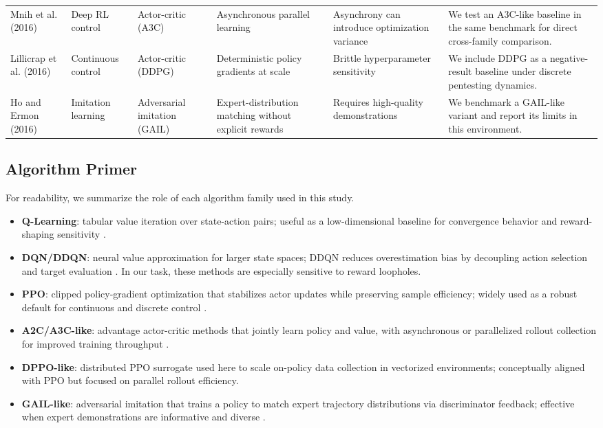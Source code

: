 \documentclass[conference]{IEEEtran}
\begin{document}
\begin{table}[t]
\begin{tabular}{llllll}
Mnih et al. (2016) \cite{mnih2016a3c} & Deep RL control & Actor-critic (A3C) & Asynchronous parallel learning & Asynchrony can introduce optimization variance & We test an A3C-like baseline in the same benchmark for direct cross-family comparison. \\
Lillicrap et al. (2016) \cite{lillicrap2016} & Continuous control & Actor-critic (DDPG) & Deterministic policy gradients at scale & Brittle hyperparameter sensitivity & We include DDPG as a negative-result baseline under discrete pentesting dynamics. \\
Ho and Ermon (2016) \cite{ho2016gail} & Imitation learning & Adversarial imitation (GAIL) & Expert-distribution matching without explicit rewards & Requires high-quality demonstrations & We benchmark a GAIL-like variant and report its limits in this environment. \\
\bottomrule
\end{tabular}
\end{table}

\subsection{Algorithm Primer}
For readability, we summarize the role of each algorithm family used in this study.
\begin{itemize}
    \item \textbf{Q-Learning}: tabular value iteration over state-action pairs; useful as a low-dimensional baseline for convergence behavior and reward-shaping sensitivity \cite{sutton2018}.
    \item \textbf{DQN/DDQN}: neural value approximation for larger state spaces; DDQN reduces overestimation bias by decoupling action selection and target evaluation \cite{mnih2015}. In our task, these methods are especially sensitive to reward loopholes.
    \item \textbf{PPO}: clipped policy-gradient optimization that stabilizes actor updates while preserving sample efficiency; widely used as a robust default for continuous and discrete control \cite{schulman2017ppo}.
    \item \textbf{A2C/A3C-like}: advantage actor-critic methods that jointly learn policy and value, with asynchronous or parallelized rollout collection for improved training throughput \cite{mnih2016a3c}.
    \item \textbf{DPPO-like}: distributed PPO surrogate used here to scale on-policy data collection in vectorized environments; conceptually aligned with PPO but focused on parallel rollout efficiency.
    \item \textbf{GAIL-like}: adversarial imitation that trains a policy to match expert trajectory distributions via discriminator feedback; effective when expert demonstrations are informative and diverse \cite{ho2016gail}.
\end{itemize}
\end{document}
